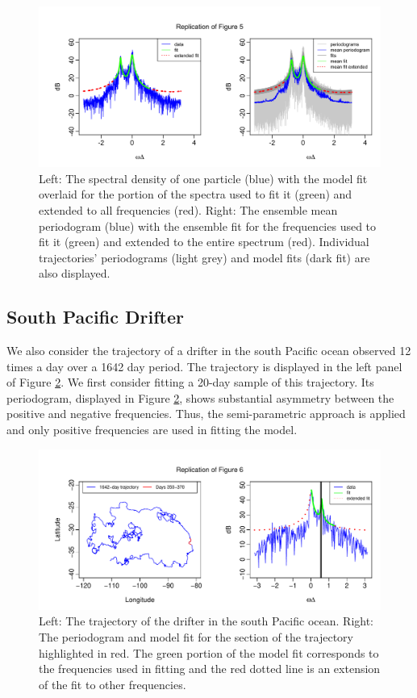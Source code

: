 \documentclass{stat572Style}
\begin{document}
\begin{figure}[h!]
  \centering
    \includegraphics[width=.95\textwidth]{ReplicatedFigures/fig5.png}
        \caption{Left: The spectral density of one particle (blue) with the model fit overlaid for the portion of the spectra used to fit it (green) and extended to all frequencies (red). Right: The ensemble mean periodogram (blue) with the ensemble fit for the frequencies used to fit it (green) and extended to the entire spectrum (red). Individual trajectories' periodograms (light grey) and model fits (dark fit) are also displayed. }
        \label{fig: fig5}
\end{figure}

\subsection{South Pacific Drifter}
\label{sec: spDrift}
We also consider the trajectory of a drifter in the south Pacific ocean observed 12 times a day over a 1642 day period.  
The trajectory is displayed in the left panel of Figure \ref{fig: fig6}. 
We first consider fitting a 20-day sample of this trajectory. 
Its periodogram, displayed in Figure \ref{fig: fig6}, shows substantial asymmetry between the positive and negative frequencies. Thus, the semi-parametric approach is applied and only positive frequencies are used in fitting the model. 

\begin{figure}[h!]
  \centering
    \includegraphics[width=.95\textwidth]{ReplicatedFigures/fig6.pdf}
        \caption{Left: The trajectory of the drifter in the south Pacific ocean. Right: The periodogram and model fit for the section of the trajectory highlighted in red. The green portion of the model fit corresponds to the frequencies used in fitting and the red dotted line is an extension of the fit to other frequencies. }
        \label{fig: fig6}
\end{figure}
\end{document}
